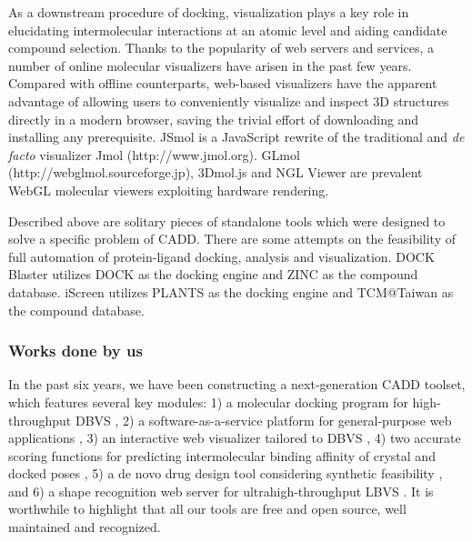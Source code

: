 \documentclass[a4paper,12pt]{article}
\begin{document}
As a downstream procedure of docking, visualization plays a key role in elucidating intermolecular interactions at an atomic level and aiding candidate compound selection. Thanks to the popularity of web servers and services, a number of online molecular visualizers have arisen in the past few years. Compared with offline counterparts, web-based visualizers have the apparent advantage of allowing users to conveniently visualize and inspect 3D structures directly in a modern browser, saving the trivial effort of downloading and installing any prerequisite. JSmol \citep{1314} is a JavaScript rewrite of the traditional and \textit{de facto} visualizer Jmol (http://www.jmol.org). GLmol (http://webglmol.sourceforge.jp), 3Dmol.js \citep{1652} and NGL Viewer \citep{1666} are prevalent WebGL molecular viewers exploiting hardware rendering.

Described above are solitary pieces of standalone tools which were designed to solve a specific problem of CADD. There are some attempts on the feasibility of full automation of protein-ligand docking, analysis and visualization. DOCK Blaster \citep{557} utilizes DOCK \citep{1222} as the docking engine and ZINC \citep{1178} as the compound database. iScreen \citep{899} utilizes PLANTS \citep{607,779} as the docking engine and TCM@Taiwan \citep{528} as the compound database.

\subsubsection*{Works done by us}

In the past six years, we have been constructing a next-generation CADD toolset, which features several key modules: 1) a molecular docking program for high-throughput DBVS \citep{1153}, 2) a software-as-a-service platform for general-purpose web applications \citep{1362}, 3) an interactive web visualizer tailored to DBVS \citep{1366,1265}, 4) two accurate scoring functions for predicting intermolecular binding affinity of crystal and docked poses \citep{1647,1796,1433,1795,1797,1434}, 5) a de novo drug design tool considering synthetic feasibility \citep{1409,1387}, and 6) a shape recognition web server for ultrahigh-throughput LBVS \citep{1749}. It is worthwhile to highlight that all our tools are free and open source, well maintained and recognized.
\end{document}
